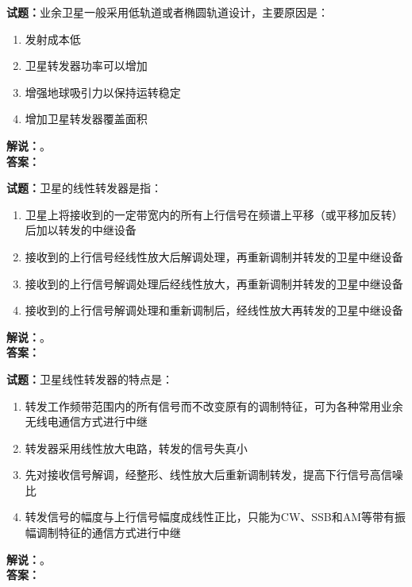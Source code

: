 \documentclass{ctexbook}
\begin{document}
\vspace{\baselineskip}

\noindent\textbf{试题：}业余卫星一般采用低轨道或者椭圆轨道设计，主要原因是：
\begin{enumerate}[leftmargin=3em]
  \item 发射成本低
  \item 卫星转发器功率可以增加
  \item 增强地球吸引力以保持运转稳定
  \item 增加卫星转发器覆盖面积
\end{enumerate}
\noindent\textbf{解说：}\textbf{}。\\\noindent\textbf{答案：}

\vspace{\baselineskip}

\noindent\textbf{试题：}卫星的线性转发器是指：
\begin{enumerate}[leftmargin=3em]
  \item 卫星上将接收到的一定带宽内的所有上行信号在频谱上平移（或平移加反转）后加以转发的中继设备
  \item 接收到的上行信号经线性放大后解调处理，再重新调制并转发的卫星中继设备
  \item 接收到的上行信号解调处理后经线性放大，再重新调制并转发的卫星中继设备
  \item 接收到的上行信号解调处理和重新调制后，经线性放大再转发的卫星中继设备
\end{enumerate}
\noindent\textbf{解说：}\textbf{}。\\\noindent\textbf{答案：}

\vspace{\baselineskip}

\noindent\textbf{试题：}卫星线性转发器的特点是：
\begin{enumerate}[leftmargin=3em]
  \item 转发工作频带范围内的所有信号而不改变原有的调制特征，可为各种常用业余无线电通信方式进行中继
  \item 转发器采用线性放大电路，转发的信号失真小
  \item 先对接收信号解调，经整形、线性放大后重新调制转发，提高下行信号高信噪比
  \item 转发信号的幅度与上行信号幅度成线性正比，只能为CW、SSB和AM等带有振幅调制特征的通信方式进行中继
\end{enumerate}
\noindent\textbf{解说：}\textbf{}。\\\noindent\textbf{答案：}

\vspace{\baselineskip}
\end{document}

